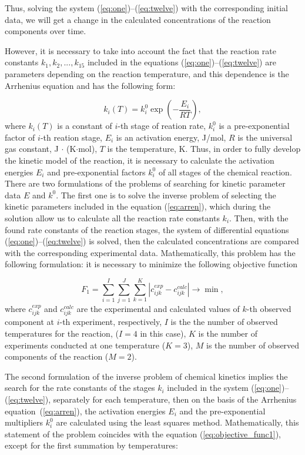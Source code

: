 \documentclass{svproc}
\begin{document}
Thus, solving the system (\ref{eq:one})--(\ref{eq:twelve}) with the corresponding initial data, we will get a change in the calculated concentrations of the reaction components over time.

However, it is necessary to take into account the fact that the reaction rate constants $k_1, k_2, ..., k_{15}$ included in the equations (\ref{eq:one})--(\ref{eq:twelve}) are parameters depending on the reaction temperature, and this dependence is the Arrhenius equation and has the following form:

\begin{equation}
  k_i (T) = k_i^0 \exp \left(- \dfrac{E_i}{RT} \right),
  \label{eq:arren}
\end{equation}
where $k_i(T)$ is a constant of $i$-th stage of reation rate, $k_i^0$ is a pre-exponential factor of $i$-th reation stage, $E_i$ is an activation energy, J/mol, $R$ is the universal gas constant, J $\cdot$ (K$\cdot$mol), $T$ is the temperature, K. Thus, in order to fully develop the kinetic model of the reaction, it is necessary to calculate the activation energies $E_i$ and pre-exponential factors $k_i^0$ of all stages of the chemical reaction.  There are two formulations of the problems of searching for kinetic parameter data $E$ and $k^0$. The first one is to solve the inverse problem of selecting the kinetic parameters included in the equation (\ref{eq:arren}), which during the solution allow us to calculate all the reaction rate constants $k_i$. Then, with the found rate constants of the reaction stages, the system of differential equations (\ref{eq:one})--(\ref{eq:twelve}) is solved, then the calculated concentrations are compared with the corresponding experimental data. Mathematically, this problem has the following formulation: it is necessary to minimize the following objective function

\begin{equation}
  F_1 = \sum_{i=1}^I \sum_{j=1}^J \sum_{k=1}^K \left| c_{ijk}^{exp} - c_{ijk}^{calc} \right| \longrightarrow \min,
  \label{eq:objective_func1}
\end{equation}
where $c_{ijk}^{exp}$ and $c_{ijk}^{calc}$ are the experimental and calculated values of $k$-th observed component at $i$-th experiment, respectively, $I$ is the the number of observed temperatures for the reaction, ($I = 4$ in this case), $K$ is the number of experiments conducted at one temperature ($K = 3$), $M$ is the number of observed components of the reaction ($M = 2$).

The second formulation of the inverse problem of chemical kinetics implies the search for the rate constants of the stages $k_i$ included in the system (\ref{eq:one})--(\ref{eq:twelve}), separately for each temperature, then on the basis of the Arrhenius equation~(\ref{eq:arren}), the activation energies $E_i$ and the pre-exponential multipliers $k_i^0$ are calculated using the least squares method. Mathematically, this statement of the problem coincides with the equation (\ref{eq:objective_func1}), except for the first summation by temperatures:
\end{document}
